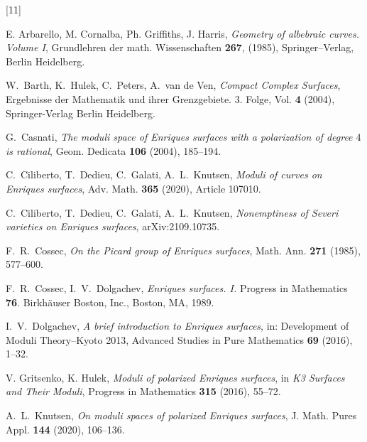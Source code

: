\documentclass[11pt]{amsart}
\theoremstyle{definition}
\begin{document}
   



\begin{thebibliography}{[11]}


\color{black}  E. Arbarello, M. Cornalba, Ph. Griffiths, J. Harris,
\emph{Geometry of albebraic curves. Volume I}, Grundlehren der math. Wissenschaften {\bf 267}, (1985), Springer--Verlag, Berlin Heidelberg. \color{black}



 W.~Barth, K.~Hulek, C.~Peters, A.~van de Ven, {\it Compact Complex Surfaces}, Ergebnisse der Mathematik und ihrer Grenzgebiete. 3. Folge,  Vol. {\bf 4}  (2004), 
    Springer-Verlag Berlin Heidelberg. 


 

 G.~Casnati, {\it
The  moduli  space  of  Enriques  surfaces  with  a  polarization  of
degree $4$ is rational}, Geom. Dedicata
{\bf 106}
(2004), 185--194. 



 C.~Ciliberto, T.~Dedieu, C.~Galati, A.~L.~Knutsen, {\it Moduli of curves on Enriques surfaces},  Adv. Math. {\bf 365} (2020), Article 107010.


 C.~Ciliberto, T.~Dedieu, C.~Galati, A.~L.~Knutsen, {\it
Nonemptiness of Severi varieties on Enriques surfaces}, \color{black} 	arXiv:2109.10735. \color{black} 



  F.~R.~Cossec, {\it On the Picard group of Enriques surfaces}, Math. Ann. {\bf 271} (1985), 577--600. 


  F.~R.~Cossec,  I.~V.~Dolgachev,  {\it Enriques surfaces. I.}
Progress in Mathematics {\bf 76}. Birkh\"auser Boston, Inc., Boston, MA, 1989.

  I.~V.~Dolgachev,  {\it A brief introduction to Enriques surfaces}, in: Development of Moduli Theory--Kyoto 2013,  Advanced Studies in Pure Mathematics {\bf 69} (2016),  1--32. 












 V. Gritsenko, K. Hulek, {\it Moduli of polarized Enriques surfaces}, in {\it K3 Surfaces and Their Moduli},  Progress in Mathematics {\bf 315} (2016), 55--72. 

 A.~L.~Knutsen, {\it On moduli spaces of polarized Enriques surfaces}, J. Math. Pures Appl. \color{black} {\bf 144} (2020), 106--136. \color{black}



\end{thebibliography}
\end{document}
